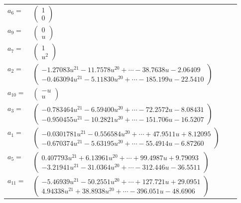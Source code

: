 \documentclass[1p]{elsarticle_modified}
\theoremstyle{definition}
\begin{document}
\begin{tabular}{m{7pt} m{180pt} m{7pt} m{180pt} }
\flushright $a_{6}=$&$\begin{pmatrix}1\\0\end{pmatrix}$ \\
\flushright $a_{9}=$&$\begin{pmatrix}0\\u\end{pmatrix}$ \\
\flushright $a_{7}=$&$\begin{pmatrix}1\\u^2\end{pmatrix}$ \\
\flushright $a_{2}=$&$\begin{pmatrix}-1.27083 u^{21}-11.7578 u^{20}+\cdots-38.7638 u-2.06409\\-0.463094 u^{21}-5.11830 u^{20}+\cdots-185.199 u-22.5410\end{pmatrix}$ \\
\flushright $a_{10}=$&$\begin{pmatrix}- u\\u\end{pmatrix}$ \\
\flushright $a_{3}=$&$\begin{pmatrix}-0.783464 u^{21}-6.59400 u^{20}+\cdots-72.2572 u-8.08431\\-0.950455 u^{21}-10.2821 u^{20}+\cdots-151.706 u-16.5207\end{pmatrix}$ \\
\flushright $a_{1}=$&$\begin{pmatrix}-0.0301781 u^{21}-0.556584 u^{20}+\cdots+47.9511 u+8.12095\\-0.670374 u^{21}-5.63195 u^{20}+\cdots-55.4914 u-6.87260\end{pmatrix}$ \\
\flushright $a_{5}=$&$\begin{pmatrix}0.407793 u^{21}+6.13961 u^{20}+\cdots+99.4987 u+9.79093\\-3.21941 u^{21}-31.0364 u^{20}+\cdots-312.446 u-36.5511\end{pmatrix}$ \\
\flushright $a_{11}=$&$\begin{pmatrix}-5.46939 u^{21}-50.2551 u^{20}+\cdots+127.721 u+29.0951\\4.94338 u^{21}+38.8938 u^{20}+\cdots-396.051 u-48.6906\end{pmatrix}$ \\

\end{tabular}
\end{document}
